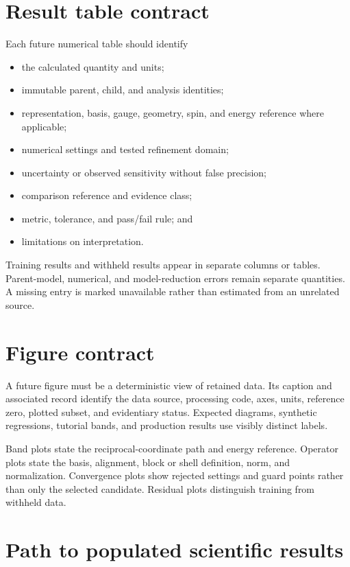 \section{Result table contract}


Each future numerical table should identify

\begin{itemize}
  \item the calculated quantity and units;
  \item immutable parent, child, and analysis identities;
  \item representation, basis, gauge, geometry, spin, and energy reference where
    applicable;
  \item numerical settings and tested refinement domain;
  \item uncertainty or observed sensitivity without false precision;
  \item comparison reference and evidence class;
  \item metric, tolerance, and pass/fail rule; and
  \item limitations on interpretation.
\end{itemize}

Training results and withheld results appear in separate columns or tables.
Parent-model, numerical, and model-reduction errors remain separate quantities.
A missing entry is marked unavailable rather than estimated from an unrelated
source.

\section{Figure contract}


A future figure must be a deterministic view of retained data. Its caption and
associated record identify the data source, processing code, axes, units,
reference zero, plotted subset, and evidentiary status. Expected diagrams,
synthetic regressions, tutorial bands, and production results use visibly
distinct labels.

Band plots state the reciprocal-coordinate path and energy reference. Operator
plots state the basis, alignment, block or shell definition, norm, and
normalization. Convergence plots show rejected settings and guard points rather
than only the selected candidate. Residual plots distinguish training from
withheld data.

\section{Path to populated scientific results}

